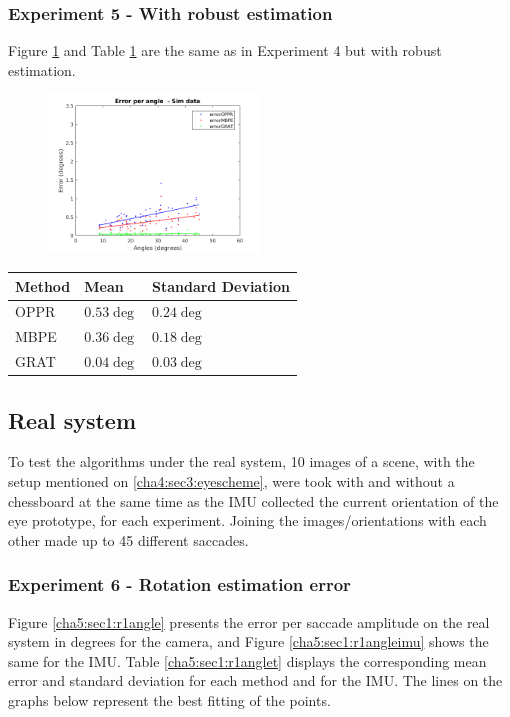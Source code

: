 \subsubsection{Experiment 5 - With robust estimation}
Figure \ref{cha5:sec1:withr} and Table \ref{cha5:sec1:withrt} are the same as in Experiment 4 but with robust estimation.\\
\begin{figure}
	\centering
	\includegraphics[width=0.5\textwidth]{images/withransac.png}
	\label{cha5:sec1:withr}
\end{figure}
\begin{table}
\begin{tabular}{| l | l | l |}
	\hline
	Method & Mean & Standard Deviation \\
	\hline
	OPPR &  $0.53 \deg$ & $0.24 \deg$ \\
	\hline
	MBPE &  $0.36 \deg$ & $0.18 \deg$ \\
	\hline
	GRAT &  $0.04 \deg$ & $0.03 \deg$ \\ 
	\hline
\end{tabular}
\label{cha5:sec1:withrt}
\end{table}

\subsection{Real system}
To test the algorithms under the real system, 10 images of a scene, with the setup mentioned on \ref{cha4:sec3:eyescheme}, were took with and without a chessboard at the same time as the IMU collected the current orientation of the eye prototype, for each experiment. Joining the images/orientations with each other made up to 45 different saccades. 
\subsubsection{Experiment 6 - Rotation estimation error}
Figure \ref{cha5:sec1:r1angle} presents the error per saccade amplitude on the real system in degrees for the camera, and Figure \ref{cha5:sec1:r1angleimu} shows the same for the IMU. Table \ref{cha5:sec1:r1anglet} displays the corresponding mean error and standard deviation for each method and for the IMU. The lines on the graphs below represent the best fitting of the points.

